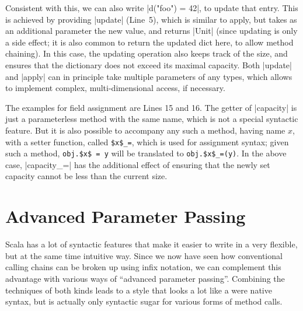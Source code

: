 Consistent with this, we can also write |d("foo") = 42|, to update that entry. This is achieved by
providing |update| (Line~5), which is similar to apply, but takes as an additional parameter the new
value, and returns |Unit| (since updating is only a side effect; it is also common to return the
updated dict here, to allow method chaining). In this case, the updating operation also keeps track
of the size, and ensures that the dictionary does not exceed its maximal capacity. Both |update| and
|apply| can in principle take multiple parameters of any types, which allows to implement complex,
multi-dimensional access, if necessary.

The examples for field assignment are Lines 15 and 16. The getter of |capacity| is just a
parameterless method with the same name, which is not a special syntactic feature. But it is also
possible to accompany any such a method, having name \(x\), with a setter function, called
\lstinline[style=inline,mathescape]|$x$_=|, which is used for assignment syntax; given such a
method, \lstinline[style=inline,mathescape]|obj.$x$ = y| will be translated to
\lstinline[style=inline,mathescape]|obj.$x$_=(y)|. In the above case, |capacity_=| has the
additional effect of ensuring that the newly set capacity cannot be less than the current size.

\section{Advanced Parameter Passing}
\label{sec:parameter_passing}

Scala has a lot of syntactic features that make it easier to write \dsls{} in a very flexible, but
at the same time intuitive way. Since we now have seen how conventional calling chains can be broken
up using infix notation, we can complement this advantage with various ways of \enquote{advanced
  parameter passing}. Combining the techniques of both kinds leads to a style that looks a lot like
a were native syntax, but is actually only syntactic sugar for various forms of method calls.

